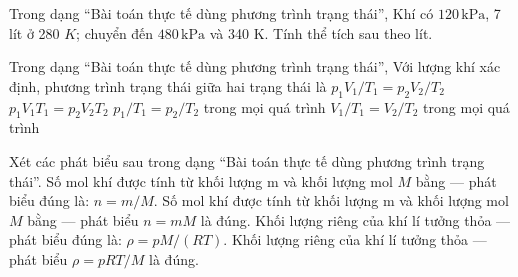 \begin{ex}
Trong dạng “Bài toán thực tế dùng phương trình trạng thái”, Khí có $120\,\text{kPa}$, 7 lít ở 280 $K$; chuyển đến $480\,\text{kPa}$ và 340 K. Tính thể tích sau theo lít.
\end{ex}

\begin{ex}
Trong dạng “Bài toán thực tế dùng phương trình trạng thái”, Với lượng khí xác định, phương trình trạng thái giữa hai trạng thái là
\choice
{\True $p_1V_1/T_1=p_2V_2/T_2$}
{$p_1V_1T_1=p_2V_2T_2$}
{$p_1/T_1=p_2/T_2$ trong mọi quá trình}
{$V_1/T_1=V_2/T_2$ trong mọi quá trình}
\end{ex}

\begin{ex}
Xét các phát biểu sau trong dạng “Bài toán thực tế dùng phương trình trạng thái”.
\choiceTF
{\True Số mol khí được tính từ khối lượng m và khối lượng mol $M$ bằng — phát biểu đúng là: $n=m/M$.}
{Số mol khí được tính từ khối lượng m và khối lượng mol $M$ bằng — phát biểu $n=mM$ là đúng.}
{\True Khối lượng riêng của khí lí tưởng thỏa — phát biểu đúng là: $\rho=pM/(RT)$.}
{Khối lượng riêng của khí lí tưởng thỏa — phát biểu $\rho=pRT/M$ là đúng.}
\end{ex}

